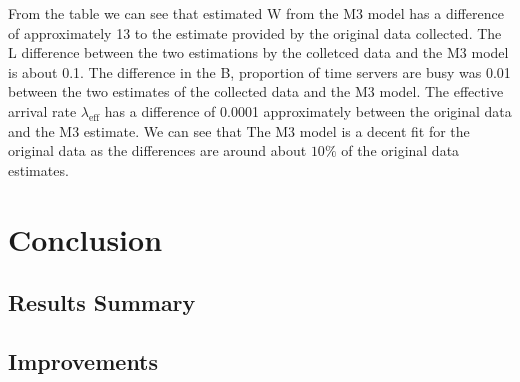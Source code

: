 \documentclass{article}
\begin{document}
From the table we can see that estimated W from the M3 model has a difference of approximately 13 to the estimate provided by the original data collected. The L difference between the two estimations by the colletced data and the M3 model is about 0.1. The difference in the B, proportion of time servers are busy was 0.01 between the two estimates of the collected data and the M3 model. The effective arrival rate $\lambda_{\text{eff}}$ has a difference of 0.0001 approximately between the original data and the M3 estimate. We can see that The M3 model is a decent fit for the original data as the differences are around about $10\%$ of the original data estimates.

\section{Conclusion}

\subsection{Results Summary}


\subsection{Improvements}
\subsection{}
\subsection{}




\end{document}
